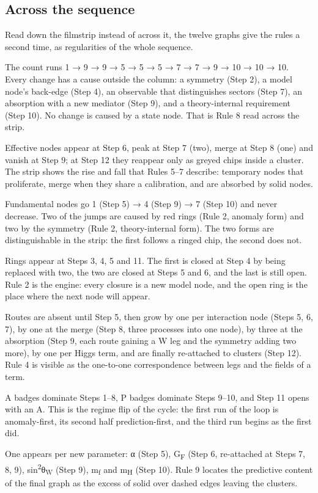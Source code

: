 \subsection*{Across the sequence}
Read down the filmstrip instead of across it, the twelve graphs give the rules a second time, as regularities of the whole sequence.
\begin{description}[style=nextline]
\item[State column.] The count runs 1 → 9 → 9 → 5 → 5 → 5 → 7 → 7 → 9 → 10 → 10 → 10. Every change has a cause outside the column: a symmetry (Step 2), a model node's back-edge (Step 4), an observable that distinguishes sectors (Step 7), an absorption with a new mediator (Step 9), and a theory-internal requirement (Step 10). No change is caused by a state node. That is Rule 8 read across the strip.
\item[Dashed model nodes.] Effective nodes appear at Step 6, peak at Step 7 (two), merge at Step 8 (one) and vanish at Step 9; at Step 12 they reappear only as greyed chips inside a cluster. The strip shows the rise and fall that Rules 5–7 describe: temporary nodes that proliferate, merge when they share a calibration, and are absorbed by solid nodes.
\item[Solid model nodes.] Fundamental nodes go 1 (Step 5) → 4 (Step 9) → 7 (Step 10) and never decrease. Two of the jumps are caused by red rings (Rule 2, anomaly form) and two by the symmetry (Rule 2, theory-internal form). The two forms are distinguishable in the strip: the first follows a ringed chip, the second does not.
\item[Red rings.] Rings appear at Steps 3, 4, 5 and 11. The first is closed at Step 4 by being replaced with two, the two are closed at Steps 5 and 6, and the last is still open. Rule 2 is the engine: every closure is a new model node, and the open ring is the place where the next node will appear.
\item[Junctions.] Routes are absent until Step 5, then grow by one per interaction node (Steps 5, 6, 7), by one at the merge (Step 8, three processes into one node), by three at the absorption (Step 9, each route gaining a W leg and the symmetry adding two more), by one per Higgs term, and are finally re-attached to clusters (Step 12). Rule 4 is visible as the one-to-one correspondence between legs and the fields of a term.
\item[Badges.] A badges dominate Steps 1–8, P badges dominate Steps 9–10, and Step 11 opens with an A. This is the regime flip of the cycle: the first run of the loop is anomaly-first, its second half prediction-first, and the third run begins as the first did.
\item[Dashed calibration edges.] One appears per new parameter: α (Step 5), G\textsubscript{F} (Step 6, re-attached at Steps 7, 8, 9), sin\textsuperscript{2}θ\textsubscript{W} (Step 9), m\textsubscript{f} and m\textsubscript{H} (Step 10). Rule 9 locates the predictive content of the final graph as the excess of solid over dashed edges leaving the clusters.
\end{description}
